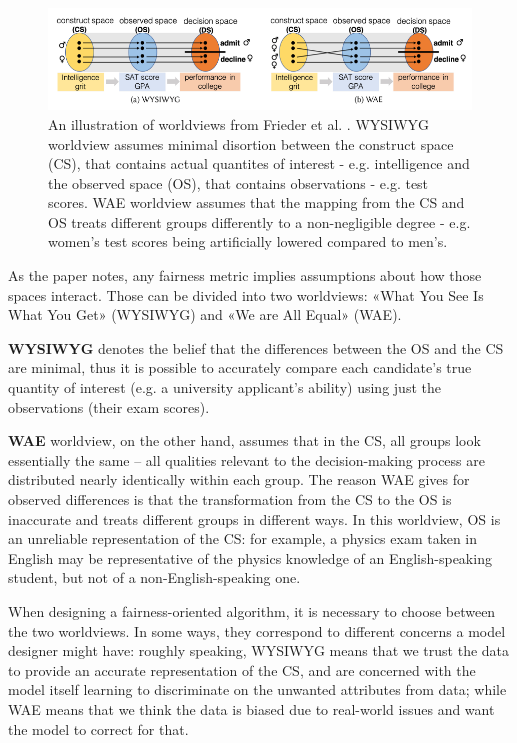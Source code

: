 \begin{figure}[t]
\includegraphics[scale=0.8]{resources/worldviews.png}
\centering
\caption{An illustration of worldviews from Frieder et al. \cite{1609.07236}. WYSIWYG worldview assumes minimal disortion between the construct space (CS), that contains actual quantites of interest - e.g. intelligence and the observed space (OS), that contains observations - e.g. test scores. WAE worldview assumes that the mapping from the CS and OS treats different groups differently to a non-negligible degree - e.g. women's test scores being artificially lowered compared to men's.}
\label{fig:ch1_worldviews}
\end{figure}

As the paper notes, any fairness metric implies assumptions about how those spaces interact. Those can be divided into two worldviews: «What You See Is What You Get» (WYSIWYG) and «We are All Equal» (WAE).

\textbf{WYSIWYG} denotes the belief that the differences between the OS and the CS are minimal, thus it is possible to accurately compare each candidate’s true quantity of interest (e.g. a university applicant’s ability) using just the observations (their exam scores).

\textbf{WAE} worldview, on the other hand, assumes that in the CS, all groups look essentially the same – all qualities relevant to the decision-making process are distributed nearly identically within each group. The reason WAE gives for observed differences is that the transformation from the CS to the OS is inaccurate and treats different groups in different ways. In this worldview, OS is an unreliable representation of the CS: for example, a physics exam taken in English may be representative of the physics knowledge of an English-speaking student, but not of a non-English-speaking one.

When designing a fairness-oriented algorithm, it is necessary to choose between the two worldviews. In some ways, they correspond to different concerns a model designer might have: roughly speaking, WYSIWYG means that we trust the data to provide an accurate representation of the CS, and are concerned with the model itself learning to discriminate on the unwanted attributes from data; while WAE means that we think the data is biased due to real-world issues and want the model to correct for that.

